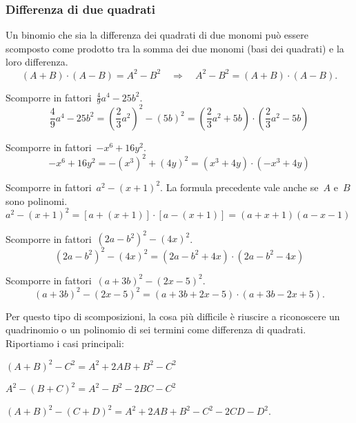 \subsubsection{Differenza di due quadrati}
\label{subsubsec:divpol_difquad}

Un binomio che sia la differenza dei quadrati di due monomi può essere 
scomposto come prodotto tra la somma dei due monomi (basi dei quadrati) e 
la loro differenza.
\begin{equation*}
(A+B)\cdot (A-B)=
A^{2}-B^{2}\quad \Rightarrow \quad A^{2}-B^{2}=(A+B)\cdot (A-B).
\end{equation*}

 \begin{esempio}
Scomporre in fattori~\(\frac{4}{9}a^{4}-25b^{2}\).
\[\frac{4}{9}a^{4}-25b^{2}=
  \left(\frac{2}{3}a^{2}\right)^{2}-\left(5b\right)^{2}=
  \left(\frac{2}{3}a^{2}+5b\right)\cdot \left(\frac{2}{3}a^{{2}}-5b\right)\]
 \end{esempio}

 \begin{esempio}
Scomporre in fattori~\(-x^{6}+16y^{2}\).
\[-x^{6}+16y^{2}=-\left(x^{3}\right)^{2}+\left(4y\right)^{2}=
  \left(x^{3}+4y\right)\cdot \left(-x^{3}+4y\right)\]
 \end{esempio}

 \begin{esempio}
Scomporre in fattori~\(a^{2}-\left(x+1\right)^{2}\).
La formula precedente vale anche se~\(A\) e~\(B\) sono polinomi. 
\(a^{2}-\left(x+1\right)^{2}=
 \left[a+(x+1)\right]\cdot \left[a-(x+1)\right]=(a+x+1)(a-x-1)\)
\end{esempio}

 \begin{esempio}
Scomporre in fattori~\(\left(2a-b^{2}\right)^{2}-(4x)^{2}\).
\[\left(2a-b^{2}\right)^{2}-(4x)^{2}=
\left(2a-b^{2}+4x\right)\cdot \left(2a-b^{2}-4x\right)\]
 \end{esempio}

 \begin{esempio}
Scomporre in fattori~\((a+3b)^{2}-(2x-5)^{2}\).
\[(a+3b)^{2}-(2x-5)^{2}=(a+3b+2x-5)\cdot (a+3b-2x+5).\]
 \end{esempio}

Per questo tipo di scomposizioni, la cosa più difficile è riuscire a 
riconoscere un quadrinomio o un polinomio di sei termini come differenza 
di quadrati. Riportiamo i casi principali:
\begin{itemize*}
 \item \((A+B)^{2}-C^{2}=A^{{2}}+2AB+B^{2}-C^{2}\)
 \item \(A^{2}-(B+C)^{2}=A^{2}-B^{2}-2BC-C^{2}\)
 \item \((A+B)^{2}-(C+D)^{2}=A^{2}+2AB+B^{2}-C^{2}-2CD-D^{2}\).
\end{itemize*}

